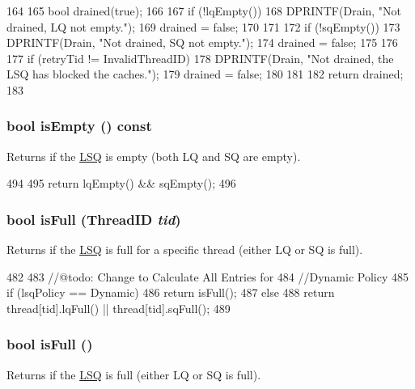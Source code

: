 \begin{DoxyCode}
164 {
165     bool drained(true);
166 
167     if (!lqEmpty()) {
168         DPRINTF(Drain, "Not drained, LQ not empty.\n");
169         drained = false;
170     }
171 
172     if (!sqEmpty()) {
173         DPRINTF(Drain, "Not drained, SQ not empty.\n");
174         drained = false;
175     }
176 
177     if (retryTid != InvalidThreadID) {
178         DPRINTF(Drain, "Not drained, the LSQ has blocked the caches.\n");
179         drained = false;
180     }
181 
182     return drained;
183 }
\end{DoxyCode}
\hypertarget{classLSQ_a479432127ee77145cc19d6a2d1590821}{
\subsubsection[{isEmpty}]{\setlength{\rightskip}{0pt plus 5cm}bool isEmpty () const}}
\label{classLSQ_a479432127ee77145cc19d6a2d1590821}
Returns if the \hyperlink{classLSQ}{LSQ} is empty (both LQ and SQ are empty). 


\begin{DoxyCode}
494 {
495     return lqEmpty() && sqEmpty();
496 }
\end{DoxyCode}
\hypertarget{classLSQ_a30fac732df9b3fda011c7329a112cb31}{
\subsubsection[{isFull}]{\setlength{\rightskip}{0pt plus 5cm}bool isFull ({\bf ThreadID} {\em tid})}}
\label{classLSQ_a30fac732df9b3fda011c7329a112cb31}
Returns if the \hyperlink{classLSQ}{LSQ} is full for a specific thread (either LQ or SQ is full). 


\begin{DoxyCode}
482 {
483     //@todo: Change to Calculate All Entries for
484     //Dynamic Policy
485     if (lsqPolicy == Dynamic)
486         return isFull();
487     else
488         return thread[tid].lqFull() || thread[tid].sqFull();
489 }
\end{DoxyCode}
\hypertarget{classLSQ_a3e70330939fdfc4dbc2f60c1a660584d}{
\subsubsection[{isFull}]{\setlength{\rightskip}{0pt plus 5cm}bool isFull ()}}
\label{classLSQ_a3e70330939fdfc4dbc2f60c1a660584d}
Returns if the \hyperlink{classLSQ}{LSQ} is full (either LQ or SQ is full). 


